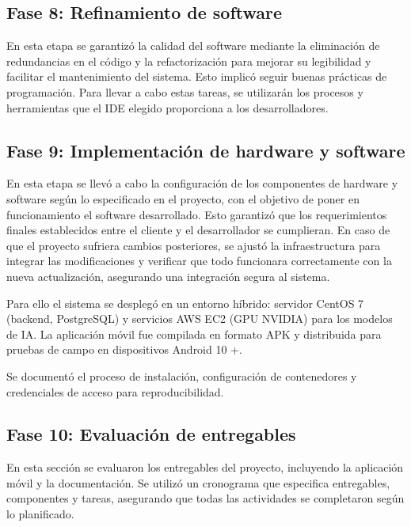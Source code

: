 \documentclass[lettersize,journal]{IEEEtran}
\begin{document}
        \subsection{Fase 8: Refinamiento de software}
        
        En esta etapa se garantizó la calidad del software mediante la eliminación de redundancias en el código y la refactorización para mejorar su legibilidad y facilitar el mantenimiento del sistema. Esto implicó seguir buenas prácticas de programación. Para llevar a cabo estas tareas, se utilizarán los procesos y herramientas que el IDE elegido proporciona a los desarrolladores.
        
        \subsection{Fase 9: Implementación de hardware y software}
        
        En esta etapa se llevó a cabo la configuración de los componentes de hardware y software según lo especificado en el proyecto, con el objetivo de poner en funcionamiento el software desarrollado. Esto garantizó que los requerimientos finales establecidos entre el cliente y el desarrollador se cumplieran. En caso de que el proyecto sufriera cambios posteriores, se ajustó la infraestructura para integrar las modificaciones y verificar que todo funcionara correctamente con la nueva actualización, asegurando una integración segura al sistema.
        
        Para ello el sistema se desplegó en un entorno híbrido: servidor CentOS 7 (backend, PostgreSQL) y servicios AWS EC2 (GPU NVIDIA) para los modelos de IA. La aplicación móvil fue compilada en formato APK y distribuida para pruebas de campo en dispositivos Android 10 +.  
        
        Se documentó el proceso de instalación, configuración de contenedores y credenciales de acceso para reproducibilidad.
        
        \subsection{Fase 10: Evaluación de entregables}
        
        En esta sección se evaluaron los entregables del proyecto, incluyendo la aplicación móvil y la documentación. Se utilizó un cronograma que especifica entregables, componentes y tareas, asegurando que todas las actividades se completaron según lo planificado.
        
\end{document}
